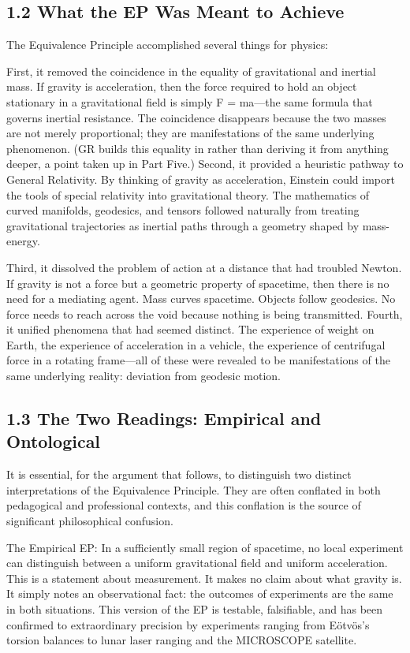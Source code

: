 \documentclass[11pt]{article}
\begin{document}
\subsection{1.2 What the EP Was Meant to Achieve}

The Equivalence Principle accomplished several things for physics:

First, it removed the coincidence in the equality of gravitational and inertial mass. If gravity is acceleration, then the force required to hold an object stationary in a gravitational field is simply F = ma---the same formula that governs inertial resistance. The coincidence disappears because the two masses are not merely proportional; they are manifestations of the same underlying phenomenon. (GR builds this equality in rather than deriving it from anything deeper, a point taken up in Part Five.) Second, it provided a heuristic pathway to General Relativity. By thinking of gravity as acceleration, Einstein could import the tools of special relativity into gravitational theory. The mathematics of curved manifolds, geodesics, and tensors followed naturally from treating gravitational trajectories as inertial paths through a geometry shaped by mass-energy.

Third, it dissolved the problem of action at a distance that had troubled Newton. If gravity is not a force but a geometric property of spacetime, then there is no need for a mediating agent. Mass curves spacetime. Objects follow geodesics. No force needs to reach across the void because nothing is being transmitted. Fourth, it unified phenomena that had seemed distinct. The experience of weight on Earth, the experience of acceleration in a vehicle, the experience of centrifugal force in a rotating frame---all of these were revealed to be manifestations of the same underlying reality: deviation from geodesic motion.

\subsection{1.3 The Two Readings: Empirical and Ontological}

It is essential, for the argument that follows, to distinguish two distinct interpretations of the Equivalence Principle. They are often conflated in both pedagogical and professional contexts, and this conflation is the source of significant philosophical confusion.

The Empirical EP: In a sufficiently small region of spacetime, no local experiment can distinguish between a uniform gravitational field and uniform acceleration. This is a statement about measurement. It makes no claim about what gravity is. It simply notes an observational fact: the outcomes of experiments are the same in both situations. This version of the EP is testable, falsifiable, and has been confirmed to extraordinary precision by experiments ranging from Eötvös's torsion balances to lunar laser ranging and the MICROSCOPE satellite.
\end{document}
